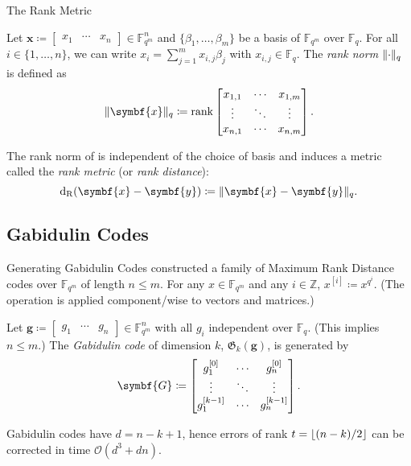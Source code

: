 \documentclass[usepdftitle=false]{beamer}
\renewcommand*{\vec}{\symbf}
\newcommand*{\mat}{\symbf}
\DeclareMathOperator{\rank}{rank}
\newcommand*{\FF}{\ensuremath{\mathbb{F}}}
\newcommand*{\ZZ}{\ensuremath{\mathbb{Z}}}
\newcommand*{\BigOh}{\mathcal{O}}
\newcommand*{\Gab}{\ensuremath{\mathfrak{G}}}
\DeclarePairedDelimiter{\floor}{\lfloor}{\rfloor}
\DeclarePairedDelimiter{\norm}{\lVert}{\rVert}
\newcommand*{\normR}[2]{\ensuremath{\norm{#1}_{#2}}}
\DeclareMathOperator{\dR}{d_R}
\begin{document}
\begin{frame}{The Rank Metric}
  \begin{definition}
    Let
    \(\vec{x} \coloneqq \begin{bmatrix} x_1 & \cdots &
      x_n \end{bmatrix} \in \FF_{q^m}^n\) and
    \(\{\beta_1, \ldots, \beta_m\}\) be a basis of \(\FF_{q^m}\) over
    \(\FF_q\).  For all \(i \in \{1, \ldots, n\}\), we can write
    \(x_i = \sum_{j = 1}^m x_{i, j} \beta_j\) with
    \(x_{i, j} \in \FF_q\).  The \emph{rank norm} \(\normR{\cdot}{q}\)
    is defined as
    \begin{equation}\label{eq:rank-norm}
      \normR{\vec{x}}{q} \coloneqq \rank \begin{bmatrix}
        x_{1, 1} & \cdots & x_{1, m} \\
        \vdots & \ddots & \vdots \\
        x_{n, 1} & \cdots & x_{n, m}
      \end{bmatrix}\text.
    \end{equation}
  \end{definition}
  The rank norm of is independent of the choice of basis and induces a
  metric called the \emph{rank metric} (or \emph{rank distance}):
  \[\dR(\vec{x} - \vec{y}) \coloneqq \normR{\vec{x} -
      \vec{y}}{q}\text.\]
\end{frame}

\subsection{Gabidulin Codes}

\begin{frame}{Generating Gabidulin Codes}
   constructed a family of Maximum Rank Distance
  codes over \(\FF_{q^m}\) of length \(n \le m\).  For any
  \(x \in \FF_{q^m}\) and any \(i \in \ZZ\),
  \(x^{[i]} \coloneqq x^{q^i}\).  (The operation is applied
  component\-/wise to vectors and matrices.)
  \begin{definition}
    Let
    \(\vec{g} \coloneqq \begin{bmatrix} g_1 & \cdots &
      g_n \end{bmatrix} \in \FF_{q^m}^n\) with all \(g_i\) independent
    over \(\FF_q\).  (This implies \(n \le m\).)  The \emph{Gabidulin
      code} of dimension \(k\), \(\Gab_k(\vec{g})\), is generated by
    \begin{equation}\label{eq:gabidulin-code-generator}
      \mat{G} \coloneqq
      \begin{bmatrix}
        g_1^{[0]} & \cdots & g_n^{[0]} \\
        \vdots & \ddots & \vdots \\
        g_1^{[k - 1]} & \cdots & g_n^{[k - 1]}
      \end{bmatrix}\text.
    \end{equation}
  \end{definition}
  Gabidulin codes have \(d = n - k + 1\), hence errors of rank
  \(t = \floor{(n - k) / {2}}\) can be corrected in time
  \(\BigOh(d^3 + d n)\).
\end{frame}
\end{document}

